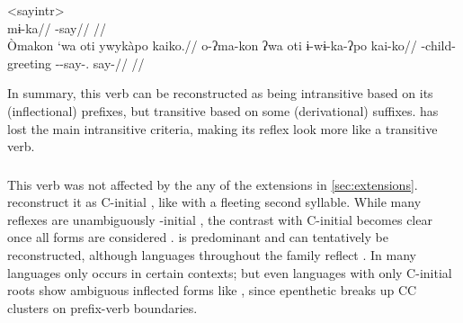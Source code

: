 \pex<sayintr>
 \akuriyo \parencite[][113]{meira1998proto}\\
\begingl
\gla mɨ-ka//
\glb {}-say//
\glft {}//
\endgl
{} \kalina \parencite[][202]{courtz2008carib}\\
\begingl
\glpreamble Òmakon `wa oti ywykàpo kaiko.//
\gla o-ʔma-kon ʔwa oti ɨ-wɨ-ka-ʔpo kai-ko//
\glb {}-child-  greeting --say-. say-//
\glft {}//
\endgl
\xe

In summary, this verb can be reconstructed as being intransitive based on its (inflectional) prefixes, but transitive based on some (derivational) suffixes.
\hixka has lost the main intransitive criteria, making its reflex look more like a transitive verb.

\subsubsection{ }
\label{sec:go}
This verb was not affected by the any of the extensions in \cref{sec:extensions}.
\textcite{gildea2007greenberg} reconstruct it as C-initial , like   with a fleeting second syllable.
While many reflexes are unambiguously -initial , the contrast with C-initial  becomes clear once all forms are considered .
 is predominant and can tentatively be reconstructed, although languages throughout the family reflect .
In many languages  only occurs in certain contexts; but even languages with only C-initial roots show ambiguous inflected forms like \trio {}  \parencite[43]{triomeira1999}, since epenthetic  breaks up CC clusters on prefix-verb boundaries.




